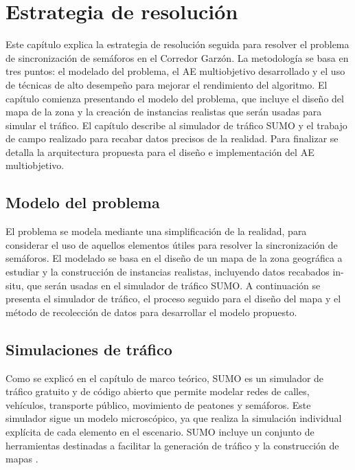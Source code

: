\chapter{Estrategia de resolución}

Este capítulo explica la estrategia de resolución seguida para resolver el problema de sincronización de semáforos en el Corredor Garzón. La metodología se basa en tres puntos: el modelado del problema, el AE multiobjetivo desarrollado y el uso de técnicas de alto desempeño para mejorar el rendimiento del algoritmo. El capítulo comienza presentando el modelo del problema, que incluye el diseño del mapa de la zona y la creación de instancias realistas que serán usadas para simular el tráfico. El capítulo describe al simulador de tráfico SUMO y el trabajo de campo realizado para recabar datos precisos de la realidad. Para finalizar se detalla la arquitectura propuesta para el diseño e implementación del AE multiobjetivo.



\section{Modelo del problema }

El problema se modela mediante una simplificación de la realidad, para considerar el uso de aquellos elementos útiles para resolver la sincronización de semáforos. El modelado se basa en el diseño de un mapa de la zona geográfica a estudiar y la construcción de instancias realistas, incluyendo datos recabados in-situ, que serán usadas en el simulador de tráfico SUMO. A continuación se presenta el simulador de tráfico, el proceso seguido para el diseño del mapa y el método de recolección de datos para desarrollar el modelo propuesto. 

\section{Simulaciones de tráfico}

Como se explicó en el capítulo de marco teórico, SUMO es un simulador de tráfico gratuito y de código abierto que permite modelar redes de calles, vehículos, transporte público, movimiento de peatones y semáforos. Este simulador sigue un modelo microscópico, ya que realiza la simulación individual explícita de cada elemento en el escenario. SUMO incluye un conjunto de herramientas destinadas a facilitar la generación de tráfico y la construcción de mapas \citep{SumoTools}. 

